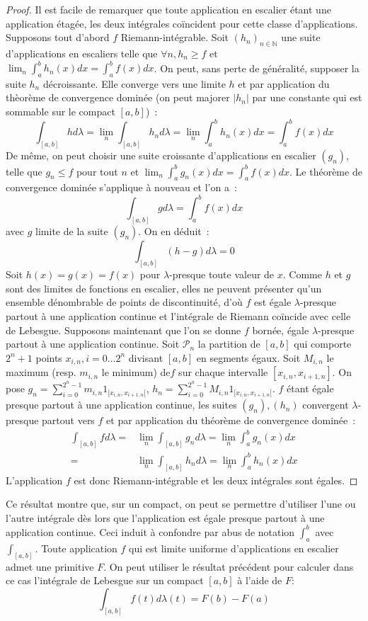 \begin{proof}
Il est facile de remarquer que toute application en escalier étant une
application étagée, les deux intégrales coïncident pour cette classe
d'applications. 
Supposons tout d'abord $f$ Riemann-intégrable.
Soit $(h_n)_{n \in \mathbb{N}}$ une suite d'applications en escaliers
 telle que $\forall n, h_n \geq f$ et
$\lim_n \int_a^b h_n(x) dx = \int_a^b f(x) dx$. On peut, sans perte de
généralité, supposer la suite $h_n$ décroissante.  Elle converge
vers une limite $h$ et par application du thèorème de convergence
dominée (on peut majorer $|h_n|$ par une constante qui est sommable
sur le compact $[a,b]$)~: 
\[
\int_{[a,b]} h d \lambda = \lim_n \int_{[a,b]} h_n d \lambda = \lim_n \int_a^b
h_n(x) dx = \int_a^b f(x) dx
\]
De même, on peut choisir une suite croissante d'applications en
escalier $(g_n)$, telle que $g_n \leq f$ pour tout $n$ et $\lim_n
\int_a^b g_n(x) dx = \int_a^b f(x) dx$. Le théorème de convergence
dominée s'applique à nouveau et l'on a~:
\[
\int_{[a,b]} g d \lambda = \int_a^b f(x) dx
\]
avec $g$ limite de la suite $(g_n)$. 
On en déduit~:
\[
\int_{[a,b]} (h-g) d \lambda = 0
\]
Soit $h(x)=g(x)=f(x)$ pour $\lambda$-presque toute valeur de
$x$. Comme $h$ et $g$ sont des limites de fonctions en escalier, elles
ne peuvent présenter qu'un ensemble dénombrable de points de
discontinuité, d'où $f$ est égale  $\lambda$-presque partout à une
application continue et l'intégrale de Riemann coïncide avec celle de Lebesgue.
Supposons maintenant que l'on se donne $f$ bornée, égale
$\lambda$-presque partout à une application continue. Soit
$\mathcal{P}_n$ la partition de $[a,b]$ qui comporte $2^n + 1$ points
$x_{i,n}, i=0 \dots 2^n$ divisant $[a,b]$ en segments égaux. Soit
$M_{i,n}$ le maximum (resp. $m_{i,n}$ le minimum) de$f$ sur
chaque intervalle $[x_{i,n}, x_{i+1,n}]$. On pose $g_n =
\sum_{i=0}^{2^n-1} m_{i,n} 1_{[x_{i,n}, x_{i+1,n}[}$,
    $h_n=\sum_{i=0}^{2^n-1} M_{i,n} 1_{[x_{i,n}, x_{i+1,n}[}$.
	$f$ étant égale presque partout à une application continue, les suites
	$(g_n),(h_n)$ convergent $\lambda$-presque partout vers $f$ et
	par application du théorème de convergence dominée~:
\begin{align*}
\int_{[a,b]} f d \lambda = & \lim_n \int_{[a,b]} g_n d\lambda = \lim_n
\int_a^b g_n(x) dx \\  
= & \lim_n \int_{[a,b]} h_n d\lambda = \lim_n \int_a^b h_n(x) dx
\end{align*}
L'application $f$ est donc Riemann-intégrable et les deux intégrales
sont égales.
\end{proof} 
Ce résultat montre que, sur un compact, on peut se permettre d'utiliser
l'une ou l'autre intégrale dès lors que l'application est égale
presque partout à une application continue. Ceci induit à confondre
par abus de notation $\int_a^b$ avec $\int_{[a,b]}$.
Toute application $f$ qui est limite uniforme d'applications en escalier admet
une primitive $F$. On peut utiliser le résultat précédent pour calculer dans ce
cas l'intégrale de Lebesgue sur un compact $[a,b]$ à l'aide de $F$:
\[
\int_{[a,b]}f(t) d \lambda(t) = F(b) - F(a)
\]

